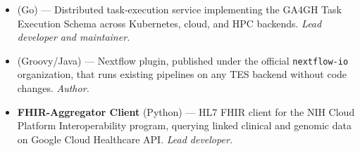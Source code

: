 \begin{itemize}
    \item \textbf{} (Go) --- Distributed task-execution service implementing the GA4GH Task Execution Schema across Kubernetes, cloud, and HPC backends. \emph{Lead developer and maintainer.}

    \item \textbf{} (Groovy/Java) --- Nextflow plugin, published under the official \texttt{nextflow-io} organization, that runs existing pipelines on any TES backend without code changes. \emph{Author.}

    \item \textbf{FHIR-Aggregator Client} (Python) --- HL7 FHIR client for the NIH Cloud Platform Interoperability program, querying linked clinical and genomic data on Google Cloud Healthcare API. \emph{Lead developer.}
\end{itemize}

